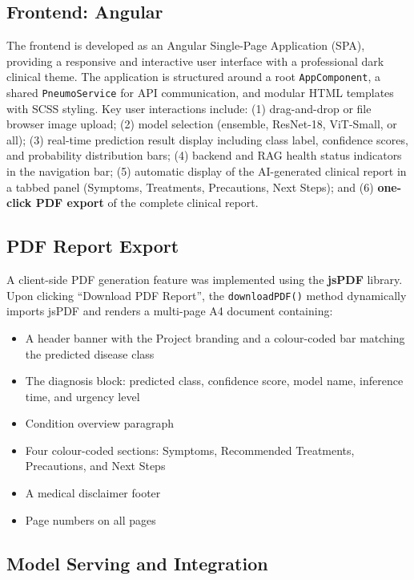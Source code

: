 \documentclass[12pt]{report}
\begin{document}
\subsection{Frontend: Angular}

The frontend is developed as an Angular Single-Page Application (SPA), providing a responsive and interactive user interface with a professional dark clinical theme. The application is structured around a root \texttt{AppComponent}, a shared \texttt{PneumoService} for API communication, and modular HTML templates with SCSS styling. Key user interactions include: (1) drag-and-drop or file browser image upload; (2) model selection (ensemble, ResNet-18, ViT-Small, or all); (3) real-time prediction result display including class label, confidence scores, and probability distribution bars; (4) backend and RAG health status indicators in the navigation bar; (5) automatic display of the AI-generated clinical report in a tabbed panel (Symptoms, Treatments, Precautions, Next Steps); and (6) \textbf{one-click PDF export} of the complete clinical report.

\subsection{PDF Report Export}

A client-side PDF generation feature was implemented using the \textbf{jsPDF} library. Upon clicking ``Download PDF Report'', the \texttt{downloadPDF()} method dynamically imports jsPDF and renders a multi-page A4 document containing:

\begin{itemize}
    \item A header banner with the Project branding and a colour-coded bar matching the predicted disease class
    \item The diagnosis block: predicted class, confidence score, model name, inference time, and urgency level
    \item Condition overview paragraph
    \item Four colour-coded sections: Symptoms, Recommended Treatments, Precautions, and Next Steps
    \item A medical disclaimer footer
    \item Page numbers on all pages
\end{itemize}

\subsection{Model Serving and Integration}
\end{document}

